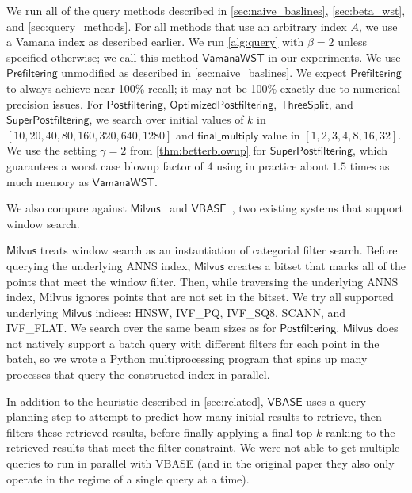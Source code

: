 \documentclass{article}
\newcommand{\myparagraph}[1]{\smallskip\noindent {\bf #1.}}
\theoremstyle{plain}
\theoremstyle{definition}
\theoremstyle{remark}
\newcommand{\shangdi}[1]{{\color{blue}{\bf Shangdi:} #1}}
\newcommand{\julian}[1]{{\color{red}{\bf Julian:} #1}}
\newcommand{\algname}[1]{\ensuremath{\mathsf{#1}}}
\begin{document}

\myparagraph{Query Methods and Hyper-parameters}
We run all of the query methods described in \cref{sec:naive_baslines}, \cref{sec:beta_wst}, and \cref{sec:query_methods}. For all methods that use an arbitrary index $A$, we use a Vamana index as described earlier. We run \cref{alg:query} with $\beta = 2$
unless specified otherwise;
we call this method \algname{Vamana WST} in our experiments. We use \algname{Prefiltering} unmodified as described in \cref{sec:naive_baslines}. We expect \algname{Prefiltering} to always achieve near 100\% recall; it may not be 100\% exactly due to numerical precision issues. For \algname{Postfiltering}, \algname{Optimized Postfiltering}, \algname{Three Split}, and \algname{Super Postfiltering}, we search over initial values of $k$ in $[10, 20, 40, 80, 160, 320, 640, 1280]$ and $\mathsf{final\_multiply}$ value in $[1, 2, 3, 4, 8, 16, 32]$. We use the setting $\gamma = 2$  from \cref{thm:betterblowup} for \algname{Super Postfiltering}, which guarantees a worst case blowup factor of $4$ using in practice about $1.5$ times as much memory as \algname{Vamana WST}. 


We also compare against \algname{Milvus}~\cite{milvus2022hybridsearch} and \algname{VBASE}~\cite{vbase}, two existing systems that support window search. 

\algname{Milvus} treats window search as an instantiation of categorial filter search. Before querying the underlying ANNS index, \algname{Milvus} creates a bitset that marks all of the points that meet the window filter. Then, while traversing the underlying ANNS index, Milvus ignores points that are not set in the bitset. We try all supported underlying \algname{Milvus} indices: HNSW, IVF\_PQ, IVF\_SQ8, SCANN, and IVF\_FLAT. We search over the same beam sizes as for \algname{Postfiltering}. \algname{Milvus} does not natively support a batch query with different filters for each point in the batch, so we wrote a Python multiprocessing program that spins up many processes that query the constructed index in parallel.

In addition to the heuristic 
described in \cref{sec:related}, \algname{VBASE} uses a query planning step to attempt to predict how many initial results to retrieve, then filters these retrieved results, before finally applying a final top-$k$ ranking to the retrieved results that meet the filter constraint. We were not able to get multiple queries to run in parallel with VBASE (and in the original paper they also only operate in the regime of a single query at a time).
\end{document}

